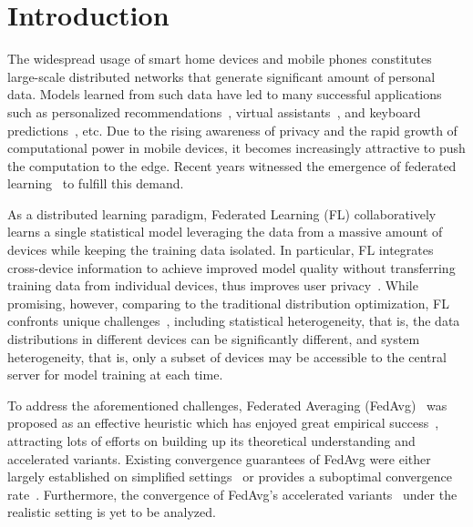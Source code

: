 

\section{Introduction}
The widespread usage of smart home devices and mobile phones constitutes
large-scale distributed networks that generate significant amount of personal data.
Models learned from such data have led to 
many successful applications such as personalized
recommendations~\cite{chen2018federated}, virtual assistants~\cite{lamautonomy}, and keyboard predictions~\cite{47586}, etc. Due to the rising awareness of  privacy and the rapid growth of
computational power in mobile devices, it becomes increasingly attractive to
push the computation to the edge. Recent years witnessed the emergence of
federated learning~\cite{mcmahan2016communication} to fulfill this demand.

As a distributed learning paradigm, Federated Learning (FL) collaboratively
learns a single statistical model leveraging the data from a massive amount of devices while
keeping the training data isolated.  In particular, FL integrates cross-device
information to achieve improved model quality without transferring training data from individual devices, thus improves user
privacy~\cite{kairouz2019advances}. While promising, however, comparing to the traditional distribution optimization,  FL confronts unique
challenges~\cite{li2019convergence,smith2017federated}, including statistical heterogeneity, that is, the data distributions in different devices can be significantly different, and system heterogeneity, that is, only a subset of devices may be accessible to the central server for model training at each time. 

To address the aforementioned challenges, Federated
Averaging (FedAvg)~\cite{mcmahan2016communication} was proposed as an
effective heuristic which has enjoyed great empirical success~\cite{47586}, attracting
lots of efforts on building up its theoretical understanding 
and accelerated variants. 
Existing convergence guarantees of FedAvg were either largely established on simplified settings~\cite{stich2018local,khaled2019first,wang2018cooperative,yu2019parallel} or provides a suboptimal 
convergence rate~\cite{li2019convergence}. Furthermore, the convergence of
FedAvg's accelerated variants~\cite{yu2019linear,huo2020faster,liu2019accelerating} under the realistic setting is yet to be analyzed.



